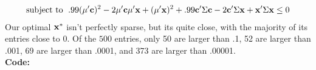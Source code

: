 \documentclass[11pt]{article}
\theoremstyle{definition}
\begin{document}
\begin{itemize}
\begin{align*}
            \text{subject to  }\; & .99({\bf \mu}'{\bf c})^2 - 2{\bf \mu}'{\bf c}{\bf \mu}'{\bf x} + ({\bf \mu}'{\bf x})^2 + .99{\bf c}'\Sigma {\bf c} - 2{\bf c}'\Sigma {\bf x} + {\bf x}'\Sigma {\bf x} \leq 0 \\
        \end{align*}
        Our optimal \({\bf x}^*\) isn't perfectly sparse, but its quite close, with the majority of its entries close to 0. Of the $500$ entries, only 50 are larger than .1, 52 are larger than .001, 69 are larger than .0001, and 373 are larger than .00001. \\ 
        {\bf Code:} \\
        




        
\end{itemize}
\end{document}
